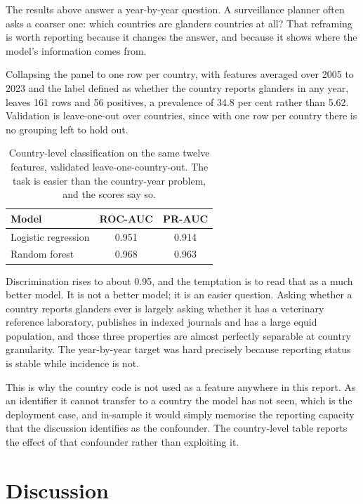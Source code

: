 \documentclass[10pt,openany]{report}
\begin{document}
The results above answer a year-by-year question. A surveillance planner often asks a coarser one:
which countries are glanders countries at all? That reframing is worth reporting because it changes
the answer, and because it shows where the model's information comes from.

Collapsing the panel to one row per country, with features averaged over 2005 to 2023 and the label
defined as whether the country reports glanders in any year, leaves 161 rows and 56 positives, a
prevalence of 34.8 per cent rather than 5.62. Validation is leave-one-out over countries, since with
one row per country there is no grouping left to hold out.

\begin{table}[htbp]
\centering
\caption{Country-level classification on the same twelve features, validated leave-one-country-out.
The task is easier than the country-year problem, and the scores say so.}
\label{tab:countrylevel}
\small
\begin{tabular}{@{}lcc@{}}
\toprule
\textbf{Model} & \textbf{ROC-AUC} & \textbf{PR-AUC} \\
\midrule
Logistic regression & 0.951 & 0.914 \\
Random forest & 0.968 & 0.963 \\
\bottomrule
\end{tabular}
\end{table}

Discrimination rises to about 0.95, and the temptation is to read that as a much better model. It is
not a better model; it is an easier question. Asking whether a country reports glanders ever is
largely asking whether it has a veterinary reference laboratory, publishes in indexed journals and
has a large equid population, and those three properties are almost perfectly separable at country
granularity. The year-by-year target was hard precisely because reporting status is stable while
incidence is not.

This is why the country code is not used as a feature anywhere in this report. As an identifier it
cannot transfer to a country the model has not seen, which is the deployment case, and in-sample it
would simply memorise the reporting capacity that the discussion identifies as the confounder. The
country-level table reports the effect of that confounder rather than exploiting it.

\section{Discussion}
\end{document}
